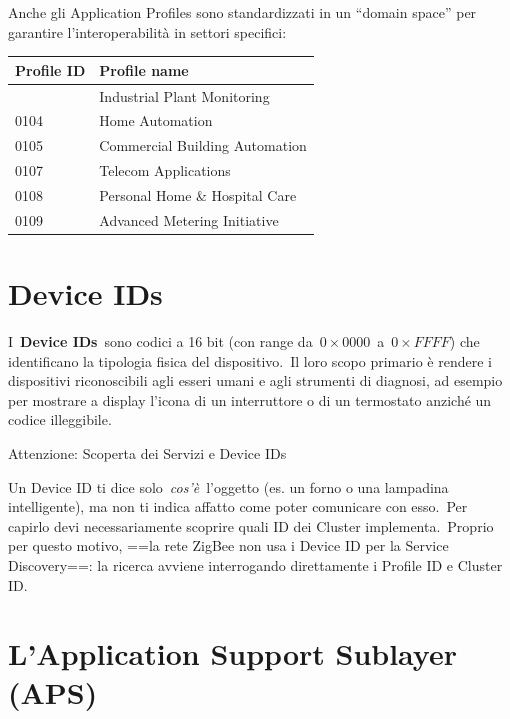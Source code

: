 \documentclass[
  italian,
  openany]{book}
\newcounter{none} %
\begin{document}
Anche gli Application Profiles sono standardizzati in un ``domain
space'' per garantire l'interoperabilità in settori specifici:

{\def\LTcaptype{none} %
\begin{longtable}[]{@{}ll@{}}
\toprule\noalign{}
\textbf{Profile ID} & \textbf{Profile name} \\
\midrule\noalign{}
\endhead
\bottomrule\noalign{}
\endlastfoot
0101 & Industrial Plant Monitoring \\
0104 & Home Automation \\
0105 & Commercial Building Automation \\
0107 & Telecom Applications \\
0108 & Personal Home \& Hospital Care \\
0109 & Advanced Metering Initiative \\
\end{longtable}
}

\section{Device IDs}\label{device-ids}

I~\textbf{Device IDs}~sono codici a 16 bit (con range
da~\(0\times0000\)~a~\(0\times FFFF\)) che identificano la tipologia
fisica del dispositivo.~Il loro scopo primario è rendere i dispositivi
riconoscibili agli esseri umani e agli strumenti di diagnosi, ad esempio
per mostrare a display l'icona di un interruttore o di un termostato
anziché un codice illeggibile.

\begin{calloutwarning}{Attenzione: Scoperta dei Servizi e Device IDs }

Un Device ID ti dice solo~\emph{cos'è}~l'oggetto (es. un forno o una
lampadina intelligente), ma non ti indica affatto come poter comunicare
con esso.~Per capirlo devi necessariamente scoprire quali ID dei Cluster
implementa.~Proprio per questo motivo, ==la rete ZigBee non usa i Device
ID per la Service Discovery==: la ricerca avviene interrogando
direttamente i Profile ID e Cluster ID.

\end{calloutwarning}

\section{L'Application Support Sublayer
(APS)}\label{lapplication-support-sublayer-aps}
\end{document}
